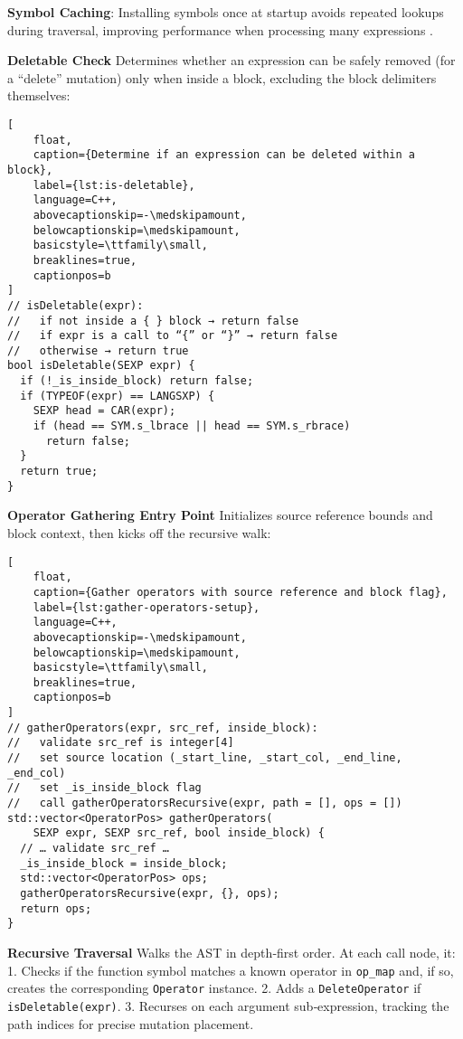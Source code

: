 \noindent\textbf{Symbol Caching}: Installing symbols once at startup avoids repeated lookups during traversal, improving performance when processing many expressions \cite{R-base}.

\medskip
\noindent\textbf{Deletable Check}  
Determines whether an expression can be safely removed (for a “delete” mutation) only when inside a block, excluding the block delimiters themselves:

\begin{lstlisting}[
    float,
    caption={Determine if an expression can be deleted within a block},
    label={lst:is-deletable},
    language=C++,
    abovecaptionskip=-\medskipamount,
    belowcaptionskip=\medskipamount,
    basicstyle=\ttfamily\small,
    breaklines=true,
    captionpos=b
]
// isDeletable(expr):
//   if not inside a { } block → return false
//   if expr is a call to “{” or “}” → return false
//   otherwise → return true
bool isDeletable(SEXP expr) {
  if (!_is_inside_block) return false;
  if (TYPEOF(expr) == LANGSXP) {
    SEXP head = CAR(expr);
    if (head == SYM.s_lbrace || head == SYM.s_rbrace)
      return false;
  }
  return true;
}
\end{lstlisting}


\medskip
\noindent\textbf{Operator Gathering Entry Point}  
Initializes source reference bounds and block context, then kicks off the recursive walk:

\begin{lstlisting}[
    float,
    caption={Gather operators with source reference and block flag},
    label={lst:gather-operators-setup},
    language=C++,
    abovecaptionskip=-\medskipamount,
    belowcaptionskip=\medskipamount,
    basicstyle=\ttfamily\small,
    breaklines=true,
    captionpos=b
]
// gatherOperators(expr, src_ref, inside_block):
//   validate src_ref is integer[4]
//   set source location (_start_line, _start_col, _end_line, _end_col)
//   set _is_inside_block flag
//   call gatherOperatorsRecursive(expr, path = [], ops = [])
std::vector<OperatorPos> gatherOperators(
    SEXP expr, SEXP src_ref, bool inside_block) {
  // … validate src_ref …
  _is_inside_block = inside_block;
  std::vector<OperatorPos> ops;
  gatherOperatorsRecursive(expr, {}, ops);
  return ops;
}
\end{lstlisting}


\medskip
\noindent\textbf{Recursive Traversal}  
Walks the AST in depth‐first order.  At each call node, it:
1. Checks if the function symbol matches a known operator in \texttt{op\_map} and, if so, creates the corresponding \texttt{Operator} instance.  
2. Adds a \texttt{DeleteOperator} if \texttt{isDeletable(expr)}.  
3. Recurses on each argument sub‐expression, tracking the path indices for precise mutation placement.

